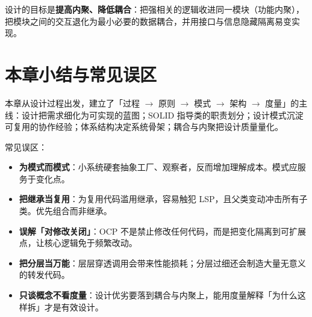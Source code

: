 \noindent 设计的目标是\textbf{提高内聚、降低耦合}：把强相关的逻辑收进同一模块（功能内聚），把模块之间的交互退化为最小必要的数据耦合，并用接口与信息隐藏隔离易变实现。

\section{本章小结与常见误区}

本章从设计过程出发，建立了「过程 $\to$ 原则 $\to$ 模式 $\to$ 架构 $\to$ 度量」的主线：设计把需求细化为可实现的蓝图；SOLID 指导类的职责划分；设计模式沉淀可复用的协作经验；体系结构决定系统骨架；耦合与内聚把设计质量量化。

常见误区：

\begin{itemize}
    \item \textbf{为模式而模式}：小系统硬套抽象工厂、观察者，反而增加理解成本。模式应服务于变化点。
    \item \textbf{把继承当复用}：为复用代码滥用继承，容易触犯 LSP，且父类变动冲击所有子类。优先组合而非继承。
    \item \textbf{误解「对修改关闭」}：OCP 不是禁止修改任何代码，而是把变化隔离到可扩展点，让核心逻辑免于频繁改动。
    \item \textbf{把分层当万能}：层层穿透调用会带来性能损耗；分层过细还会制造大量无意义的转发代码。
    \item \textbf{只谈概念不看度量}：设计优劣要落到耦合与内聚上，能用度量解释「为什么这样拆」才是有效设计。
\end{itemize}
